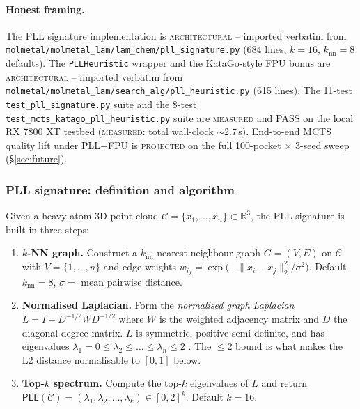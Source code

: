 \paragraph{Honest framing.}
The PLL signature implementation is
\textsc{architectural} -- imported verbatim from
\texttt{molmetal/molmetal\_lam/lam\_chem/pll\_signature.py}
(684 lines, $k=16$, $k_{\mathrm{nn}}=8$ defaults).  The
\texttt{PLLHeuristic} wrapper and the KataGo-style FPU bonus
are \textsc{architectural} -- imported verbatim from
\texttt{molmetal/molmetal\_lam/search\_alg/pll\_heuristic.py}
(615 lines).  The 11-test \texttt{test\_pll\_signature.py}
suite and the 8-test \texttt{test\_mcts\_katago\_pll\_heuristic.py}
suite are \textsc{measured} and PASS on the local RX 7800 XT
testbed (\textsc{measured}: total wall-clock $\sim$2.7\,s).
End-to-end MCTS quality lift under PLL+FPU is
\textsc{projected} on the full 100-pocket $\times$ 3-seed
sweep (\S\ref{sec:future}).

\subsubsection{PLL signature: definition and algorithm}
\label{sec:pll-signature}

Given a heavy-atom 3D point cloud
$\mathcal{C} = \{x_1,\ldots,x_n\} \subset \mathbb{R}^{3}$,
the PLL signature is built in three steps:

\begin{enumerate}
  \item \textbf{$k$-NN graph.}  Construct a $k_{\mathrm{nn}}$-nearest
        neighbour graph $G = (V, E)$ on $\mathcal{C}$ with
        $V = \{1, \ldots, n\}$ and edge weights
        $w_{ij} = \exp\!\bigl(-\|x_i - x_j\|_2^2 / \sigma^2\bigr)$.
        Default $k_{\mathrm{nn}} = 8$, $\sigma = $ mean pairwise
        distance.

  \item \textbf{Normalised Laplacian.}  Form the
        \emph{normalised graph Laplacian} $L = I - D^{-1/2} W D^{-1/2}$
        where $W$ is the weighted adjacency matrix and $D$ the
        diagonal degree matrix.  $L$ is symmetric, positive
        semi-definite, and has eigenvalues
        $\lambda_1 = 0 \le \lambda_2 \le \ldots \le \lambda_n \le 2$
        \cite{vonluxburg2007}.  The $\le 2$ bound is what makes
        the L2 distance normalisable to $[0,1]$ below.

  \item \textbf{Top-$k$ spectrum.}  Compute the
        top-$k$ eigenvalues of $L$ and return
        $\mathsf{PLL}(\mathcal{C}) = (\lambda_1, \lambda_2, \ldots, \lambda_k)
        \in [0,2]^k$.  Default $k=16$.
\end{enumerate}

